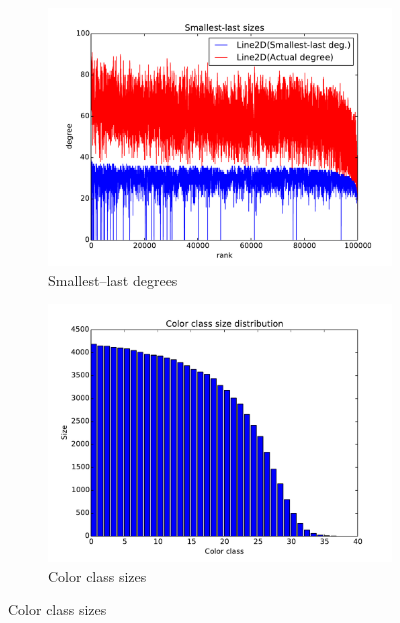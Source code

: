 \documentclass[oneside, titlepage]{scrartcl}
\begin{document}
\begin{figure}[!h]
\begin{subfigure}{0.5\textwidth}
	\centering
	\includegraphics[width=0.9\linewidth]{figures/ordering40.pdf}
	\caption{Smallest--last degrees}
\end{subfigure}%
\begin{subfigure}{0.5\textwidth}
	\centering
	\includegraphics[width=0.9\linewidth]{figures/colors40.pdf}
	\caption{Color class sizes}
\end{subfigure}


\end{figure}
\end{document}
